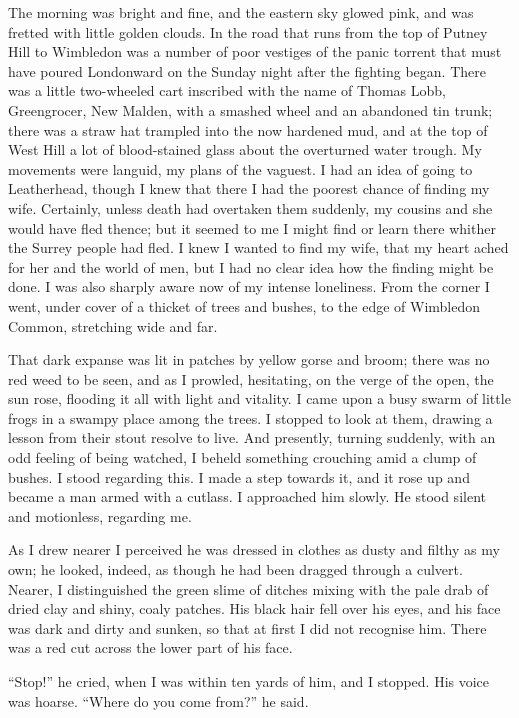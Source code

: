 The morning was bright and fine, and the eastern sky glowed pink,
and was fretted with little golden clouds. In the road that runs
from the top of Putney Hill to Wimbledon was a number of poor
vestiges of the panic torrent that must have poured Londonward on
the Sunday night after the fighting began. There was a little
two-wheeled cart inscribed with the name of Thomas Lobb,
Greengrocer, New Malden, with a smashed wheel and an abandoned tin
trunk; there was a straw hat trampled into the now hardened mud,
and at the top of West Hill a lot of blood-stained glass about the
overturned water trough. My movements were languid, my plans of the
vaguest. I had an idea of going to Leatherhead, though I knew that
there I had the poorest chance of finding my wife. Certainly,
unless death had overtaken them suddenly, my cousins and she would
have fled thence; but it seemed to me I might find or learn there
whither the Surrey people had fled. I knew I wanted to find my
wife, that my heart ached for her and the world of men, but I had
no clear idea how the finding might be done. I was also sharply
aware now of my intense loneliness. From the corner I went, under
cover of a thicket of trees and bushes, to the edge of Wimbledon
Common, stretching wide and far.

That dark expanse was lit in patches by yellow gorse and broom;
there was no red weed to be seen, and as I prowled, hesitating, on
the verge of the open, the sun rose, flooding it all with light and
vitality. I came upon a busy swarm of little frogs in a swampy
place among the trees. I stopped to look at them, drawing a lesson
from their stout resolve to live. And presently, turning suddenly,
with an odd feeling of being watched, I beheld something crouching
amid a clump of bushes. I stood regarding this. I made a step
towards it, and it rose up and became a man armed with a cutlass. I
approached him slowly. He stood silent and motionless, regarding
me.

As I drew nearer I perceived he was dressed in clothes as dusty and
filthy as my own; he looked, indeed, as though he had been dragged
through a culvert. Nearer, I distinguished the green slime of
ditches mixing with the pale drab of dried clay and shiny, coaly
patches. His black hair fell over his eyes, and his face was dark
and dirty and sunken, so that at first I did not recognise him.
There was a red cut across the lower part of his face.

``Stop!'' he cried, when I was within ten yards of him, and I
stopped. His voice was hoarse. ``Where do you come from?'' he said.

